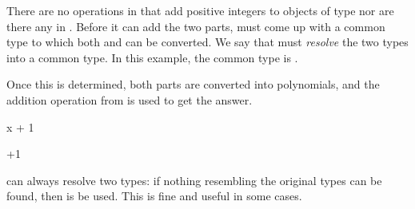 There are no operations in  that add
positive integers to objects of type  nor
are there any in .
Before it can add the two parts, \Language{} must come up with
a common type to which both  and  can be
converted.
We say that \Language{} must {\it resolve} the two types
into a common type.
In this example, the common type is .

\begin{xtc}
\begin{xtccomment}
Once this is determined, both parts are converted into polynomials,
and the addition operation from  is used to
get the answer.
\end{xtccomment}
\begin{spadsrc}
x + 1
\end{spadsrc}
\begin{TeXOutput}
\begin{fricasmath}{3}
+1%
\end{fricasmath}
\end{TeXOutput}
\end{xtc}
\begin{xtc}
\begin{xtccomment}
\Language{} can always resolve two types: if nothing resembling
the original types can be found, then  is be used.
This is fine and useful in some cases.
\end{xtccomment}
\begin{spadsrc}
["string",3.14159]
\end{spadsrc}
\begin{TeXOutput}
\begin{fricasmath}{4}
%
\end{fricasmath}
\end{TeXOutput}
\end{xtc}
